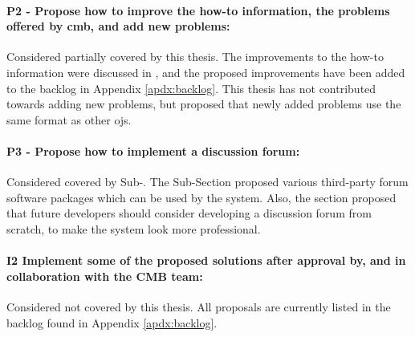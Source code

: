 \paragraph*{P2 - Propose how to improve the how-to information, the problems offered by \gls{cmb}, and add new problems:} Considered partially covered by this thesis. The improvements to the how-to information were discussed in , and the proposed improvements have been added to the backlog in Appendix \ref{apdx:backlog}. This thesis has not contributed towards adding new problems, but  proposed that newly added problems use the same format as other \glspl{oj}.

\paragraph*{P3 - Propose how to implement a discussion forum:} Considered covered by Sub-. The Sub-Section proposed various third-party forum software packages which can be used by the system. Also, the section proposed that future developers should consider developing a discussion forum from scratch, to make the system look more professional.

\paragraph*{I2 Implement some of the proposed solutions after approval by, and in collaboration with the CMB team:} Considered not covered by this thesis. All proposals are currently listed in the backlog found in Appendix \ref{apdx:backlog}.

